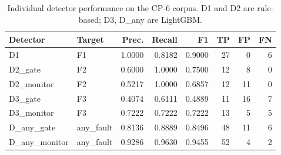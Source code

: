\begin{table}[htbp]
\centering
\caption{Individual detector performance on the CP-6 corpus. D1 and D2 are rule-based; D3, D\_any are LightGBM.}
\label{tab:detector_comparison}
\small
\begin{tabular}{llrrrrrr}
\toprule
Detector & Target & Prec. & Recall & F1 & TP & FP & FN \\
\midrule
D1 & F1 & 1.0000 & 0.8182 & 0.9000 & 27 & 0 & 6 \\
D2_gate & F2 & 0.6000 & 1.0000 & 0.7500 & 12 & 8 & 0 \\
D2_monitor & F2 & 0.5217 & 1.0000 & 0.6857 & 12 & 11 & 0 \\
D3_gate & F3 & 0.4074 & 0.6111 & 0.4889 & 11 & 16 & 7 \\
D3_monitor & F3 & 0.7222 & 0.7222 & 0.7222 & 13 & 5 & 5 \\
D_any_gate & any_fault & 0.8136 & 0.8889 & 0.8496 & 48 & 11 & 6 \\
D_any_monitor & any_fault & 0.9286 & 0.9630 & 0.9455 & 52 & 4 & 2 \\
\bottomrule
\end{tabular}
\end{table}